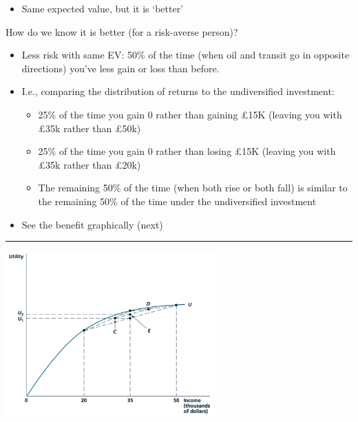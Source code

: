 \documentclass[]{article}
\providecommand{\tightlist}{%
  \setlength{\itemsep}{0pt}\setlength{\parskip}{0pt}}
\begin{document}
\begin{itemize}
\tightlist
\item
  Same expected value, but it is `better'
\end{itemize}

\bigskip

How do we know it is better (for a risk-averse person)?

\begin{itemize}
\item
  Less risk with same EV: 50\% of the time (when oil and transit go in
  opposite directions) you've less gain or loss than before.
\item
  I.e., comparing the distribution of returns to the undiversified
  investment:

  \begin{itemize}
  \tightlist
  \item
    25\% of the time you gain 0 rather than gaining \pounds 15K (leaving
    you with £35k rather than \pounds 50k)
  \item
    25\% of the time you gain 0 rather than losing \pounds 15K (leaving
    you with \pounds 35k rather than \pounds 20k)
  \item
    The remaining 50\% of the time (when both rise or both fall) is
    similar to the remaining 50\% of the time under the undiversified
    investment
  \end{itemize}
\end{itemize}

\begin{itemize}
\tightlist
\item
  See the benefit graphically (next)
\end{itemize}

\begin{center}\rule{0.5\linewidth}{\linethickness}\end{center}

\includegraphics[height=2.5in]{picsfigs/diverselessrisk.png}
\end{document}
